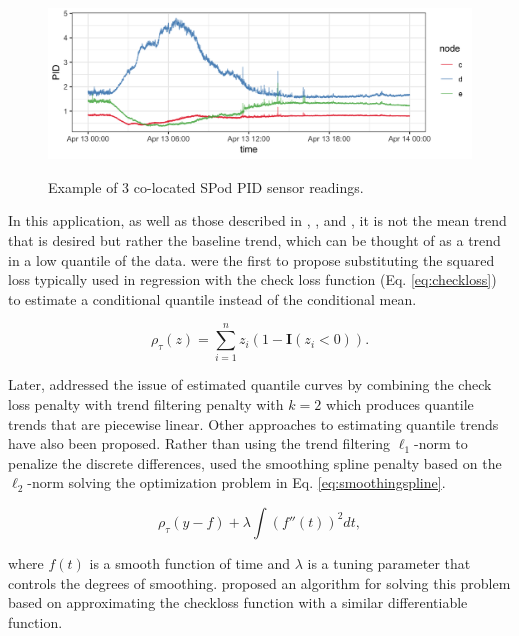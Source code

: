 \documentclass[12pt]{article}
\begin{document}
	\begin{figure}[b!]
		\caption{Example of 3 co-located SPod PID sensor readings.}
		\includegraphics[width = \linewidth]{Figures/uncorrected_data.png}
		\label{fig:raw_spod}
	\end{figure}
   	
	
	In this application, as well as those described in \cite{Ning2014}, \cite{marandi2015qualitative}, and \cite{pettersson2013algorithm}, it is not the mean trend that is desired but rather the baseline trend, which can be thought of as a trend in a low quantile of the data.  \cite{Koenker1978} were the first to propose substituting the squared loss typically used in regression with the check loss function  (Eq. \ref{eq:checkloss}) to estimate a conditional quantile instead of the conditional mean. 
	
	\begin{equation}
	\label{eq:checkloss}
	 \rho_{\tau}(z) = \sum_{i=1}^n z_i(1-\mathbf{I}(z_i<0)).
	\end{equation}
	
	Later, \cite{KoenkerNgPortnoy1994} addressed the issue of estimated quantile curves by combining the check loss penalty with trend filtering penalty with $k = 2$ which produces quantile trends that are piecewise linear. Other approaches to estimating quantile trends have also been proposed. Rather than using the trend filtering $\ell_1$-norm to penalize the discrete differences, \cite{nychka1995nonparametric} used the smoothing spline penalty based on the $\ell_2$-norm solving the optimization problem in Eq. \ref{eq:smoothingspline}. 
	
	\begin{equation*}
	\label{eq:smoothingspline}
	\rho_{\tau}(y - f) + \lambda\int (f''(t))^2 dt, 
 	\end{equation*}
	
	where $f(t)$ is a smooth function of time and $\lambda$ is a tuning parameter that controls the degrees of smoothing. \cite{Oh2011} proposed an algorithm for solving this problem based on approximating the checkloss function with a similar differentiable function. 
	
\end{document}
